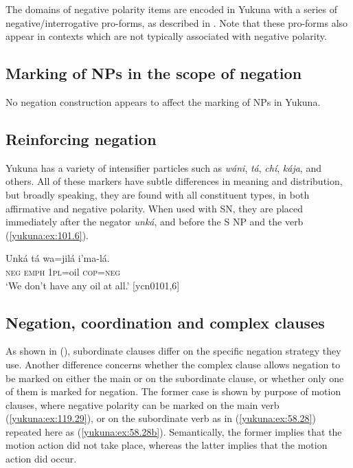 \documentclass[output=paper,colorlinks,citecolor=brown]{langscibook}
\begin{document}
The domains of negative polarity items are encoded in Yukuna with a series of negative/interrogative pro-forms, as described in . Note that these pro-forms also appear in contexts which are not typically associated with negative polarity. 

\subsection{Marking of NPs in the scope of negation}\label{yukuna:negnp}

No negation construction appears to affect the marking of NPs in Yukuna. 

\subsection{Reinforcing negation}\label{yukuna:emph}


Yukuna has a variety of intensifier particles such as \textit{wáni}, \textit{tá}, \textit{chí}, \textit{kája}, and others. All of these markers have subtle differences in meaning and distribution, but broadly speaking, they are found with all constituent types, in both affirmative and negative polarity. When used with SN, they are placed immediately after the negator \textit{unká}, and before the S NP and the verb (\ref{yukuna:ex:101.6}). 

\ea\label{yukuna:ex:101.6}
\gll Unká tá wa=jilá i'ma-lá.\\
\textsc{neg} \textsc{emph} \textsc{1pl}=oil \textsc{cop=neg}\\
\glt ‘We don't have any oil at all.' [ycn0101,6]
\z

\subsection{Negation, coordination and complex clauses}\label{yukuna:complex}

As shown in (), subordinate clauses differ on the specific negation strategy they use. Another difference concerns whether the complex clause allows negation to be marked on either the main or on the subordinate clause, or whether only one of them is marked for negation. The former case is shown by purpose of motion clauses, where negative polarity can be marked on the main verb (\ref{yukuna:ex:119.29}), or on the subordinate verb as in (\ref{yukuna:ex:58.28}) repeated here as (\ref{yukuna:ex:58.28b}). Semantically, the former implies that the motion action did not take place, whereas the latter implies that the motion action did occur. 
\end{document}
